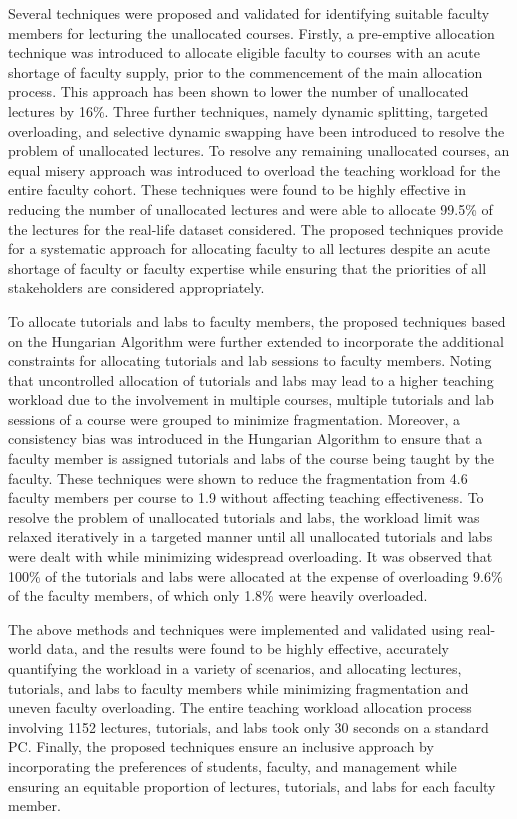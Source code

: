 Several techniques were proposed and validated for identifying suitable faculty members for lecturing the unallocated courses. Firstly, a pre-emptive allocation technique was introduced to allocate eligible faculty to courses with an acute shortage of faculty supply, prior to the commencement of the main allocation process. This approach has been shown to lower the number of unallocated lectures by 16\%. Three further techniques, namely dynamic splitting, targeted overloading, and selective dynamic swapping have been introduced to resolve the problem of unallocated lectures. To resolve any remaining unallocated courses, an equal misery approach was introduced to overload the teaching workload for the entire faculty cohort. These techniques were found to be highly effective in reducing the number of unallocated lectures and were able to allocate 99.5\% of the lectures for the real-life dataset considered. The proposed techniques provide for a systematic approach for allocating faculty to all lectures despite an acute shortage of faculty or faculty expertise while ensuring that the priorities of all stakeholders are considered appropriately.

To allocate tutorials and labs to faculty members, the proposed techniques based on the Hungarian Algorithm were further extended to incorporate the additional constraints for allocating tutorials and lab sessions to faculty members. Noting that uncontrolled allocation of tutorials and labs may lead to a higher teaching workload due to the involvement in multiple courses, multiple tutorials and lab sessions of a course were grouped to minimize fragmentation. Moreover, a consistency bias was introduced in the Hungarian Algorithm to ensure that a faculty member is assigned tutorials and labs of the course being taught by the faculty. These techniques were shown to reduce the fragmentation from 4.6 faculty members per course to 1.9 without affecting teaching effectiveness. To resolve the problem of unallocated tutorials and labs, the workload limit was relaxed iteratively in a targeted manner until all unallocated tutorials and labs were dealt with while minimizing widespread overloading. It was observed that 100\% of the tutorials and labs were allocated at the expense of overloading 9.6\% of the faculty members, of which only 1.8\% were heavily overloaded.

The above methods and techniques were implemented and validated using real-world data, and the results were found to be highly effective, accurately quantifying the workload in a variety of scenarios, and allocating lectures, tutorials, and labs to faculty members while minimizing fragmentation and uneven faculty overloading. The entire teaching workload allocation process involving 1152 lectures, tutorials, and labs took only 30 seconds on a standard PC. Finally, the proposed techniques ensure an inclusive approach by incorporating the preferences of students, faculty, and management while ensuring an equitable proportion of lectures, tutorials, and labs for each faculty member.

